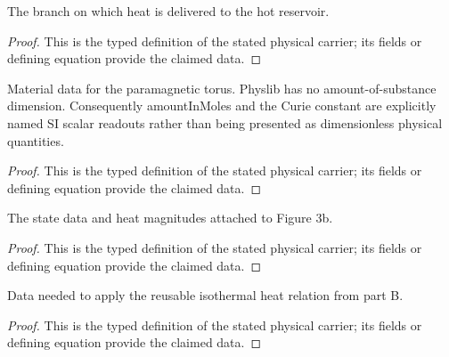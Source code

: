 \begin{definition}
  \label{def:physics:IPhO_2026_3_C_5:aux012}
  The branch on which heat is delivered to the hot reservoir.
\end{definition}
\begin{proof}
  This is the typed definition of the stated physical carrier; its fields or defining equation provide the claimed data.
\end{proof}

\begin{definition}
  \label{def:physics:IPhO_2026_3_C_5:aux013}
  Material data for the paramagnetic torus. Physlib has no amount-of-substance dimension. Consequently amountInMoles and the Curie constant are explicitly named SI scalar readouts rather than being presented as dimensionless physical quantities.
\end{definition}
\begin{proof}
  This is the typed definition of the stated physical carrier; its fields or defining equation provide the claimed data.
\end{proof}

\begin{definition}
  \label{def:physics:IPhO_2026_3_C_5:aux014}
  The state data and heat magnitudes attached to Figure 3b.
\end{definition}
\begin{proof}
  This is the typed definition of the stated physical carrier; its fields or defining equation provide the claimed data.
\end{proof}

\begin{definition}
  \label{def:physics:IPhO_2026_3_C_5:aux015}
  Data needed to apply the reusable isothermal heat relation from part B.
\end{definition}
\begin{proof}
  This is the typed definition of the stated physical carrier; its fields or defining equation provide the claimed data.
\end{proof}

